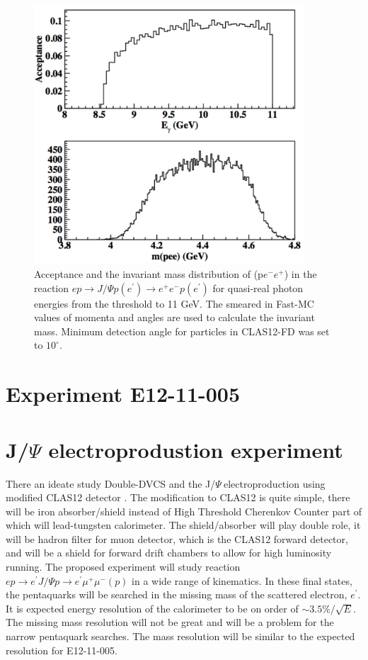\documentclass[12pt]{revtex4}
\newcommand{\JP}{J/$\Psi~$}
\begin{document}
\begin{figure}[htbp]
\begin{center}
\includegraphics[width=0.9\textwidth]{pee_acceptance_mass_10.pdf}
\caption{Acceptance and the invariant mass distribution of (p$e^-e^+$) in the reaction $e p\to J/\Psi p (e^\prime)\to e^+ e^- p (e^\prime)$ for quasi-real photon energies from the threshold to 11 GeV. The smeared in Fast-MC values of momenta and angles are used to calculate the invariant mass. Minimum detection angle for particles in CLAS12-FD was set to $10^\circ$.}
\label{fig:acc_mpee_10}
\end{center}
\end{figure}
\clearpage

\section{Experiment E12-11-005}



\section{J/$\Psi$ electroprodustion experiment}

There an ideate study Double-DVCS and the \JP electroproduction using modified CLAS12 detector \cite{dimuon_loi}. The modification to CLAS12 is quite simple, there will be iron absorber/shield instead of High Threshold Cherenkov Counter part of which will lead-tungsten calorimeter. The shield/absorber will play double role, it will be hadron filter for muon detector, which is the CLAS12 forward detector, and will be a shield for forward drift chambers to allow for high luminosity running. The proposed experiment will study reaction  $e p\to e^\prime J/\Psi p \to e^\prime\mu^+ \mu^- (p)$ in a wide range of kinematics. In these final states, the pentaquarks will be searched in the missing mass of the scattered electron, $e^\prime$. It is expected energy resolution of the calorimeter to be on order of $\sim 3.5\%/\sqrt E$. The missing mass resolution will not be great and will be a problem for the narrow pentaquark searches. The mass resolution will be similar to the expected resolution for E12-11-005. 
\end{document}
